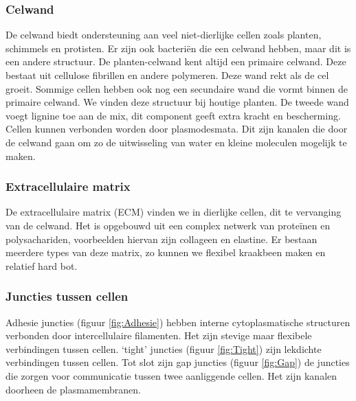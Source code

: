 \documentclass[a4paper,kul]{kulakarticle} %
\begin{document}
\subsubsection{Celwand}
De celwand biedt ondersteuning aan veel niet-dierlijke cellen zoals planten, schimmels en protisten. Er zijn ook bacteriën die een celwand hebben, maar dit is een andere structuur. De planten-celwand kent  altijd een primaire celwand. Deze bestaat uit cellulose fibrillen en andere polymeren. Deze wand rekt als de cel groeit. Sommige cellen hebben ook nog een secundaire wand die vormt binnen de primaire celwand. We vinden deze structuur bij houtige planten. De tweede wand voegt lignine toe aan de mix, dit component geeft extra kracht en bescherming. Cellen kunnen verbonden worden door plasmodesmata. Dit zijn kanalen die door de celwand gaan om zo de uitwisseling van water en kleine moleculen mogelijk te maken.
\subsubsection{Extracellulaire matrix}
De extracellulaire matrix (ECM) vinden we in dierlijke cellen, dit te vervanging van de celwand. Het is opgebouwd uit een complex netwerk van proteïnen en polysachariden, voorbeelden hiervan zijn collageen en elastine. Er bestaan meerdere types van deze matrix, zo kunnen we flexibel kraakbeen maken en relatief hard bot. 
\subsubsection{Juncties tussen cellen}
Adhesie juncties (figuur \ref{fig:Adhesie}) hebben interne cytoplasmatische structuren verbonden door intercellulaire filamenten. Het zijn stevige maar flexibele verbindingen tussen cellen. `tight' juncties (figuur \ref{fig:Tight}) zijn lekdichte verbindingen tussen cellen. Tot slot zijn gap juncties (figuur \ref{fig:Gap}) de juncties die zorgen voor communicatie tussen twee aanliggende cellen. Het zijn kanalen doorheen de plasmamembranen.   
\end{document}
